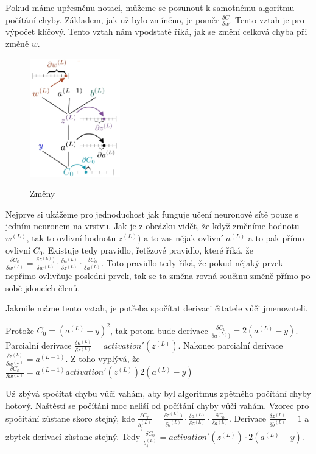 Pokud máme upřesněnu notaci, můžeme se posunout k samotnému algoritmu počítání chyby.
Základem, jak už bylo zmíněno, je poměr \(\frac{\delta C}{\delta w}\). Tento vztah je pro výpočet klíčový.
Tento vztah nám vpodstatě říká, jak se změní celková chyba při změně \(w\).

\begin{figure}[h]
    \centering
    \includegraphics[width=0.35\textwidth]{images/delta.png}
    \caption{Změny} \cite{delta}
\end{figure}

Nejprve si ukážeme pro jednoduchost jak funguje učení neuronové sítě pouze s jedním neuronem na vrstvu. Jak je z obrázku vidět, že když změníme hodnotu \(w^{(L)}\), tak to ovlivní hodnotu \(z^{(L)})\) a to zas nějak ovlivní \(a^{(L)}\) a to pak přímo ovlivní \(C_0\).
Existuje tedy pravidlo, řetězové pravidlo\cite{chain_rule}, které říká, že \(\frac{\delta C_0}{\delta w^{(L)}} = \frac{\delta z^{(L)})}{\delta w^{(L)}} \cdot \frac{\delta a^{(L)}}{\delta z^{(L)}} \cdot \frac{\delta C_0}{\delta a^{(L)}}\).
Toto pravidlo tedy říká, že pokud nějaký prvek nepřímo ovlivňuje poslední prvek, tak se ta změna rovná součinu změně přímo po sobě jdoucích členů.

Jakmile máme tento vztah, je potřeba spočítat derivaci čitatele vůči jmenovateli.

Protože \(C_0 = (a^{(L)} - y)^2\), tak potom bude derivace \(\frac{\delta C_0}{\delta a^{(L)})}= 2(a^{(L)} - y)\).
Parcialní derivace \(\frac{\delta a^{(L)}}{\delta z^{(L)}} = activation'(z^{(L)}) \).
Nakonec parcialní derivace \(\frac{\delta z^{(L)}}{\delta w^{(L)}} = a^{(L-1)}\).
Z toho vyplývá, že \(\frac{\delta C_0}{\delta w^{(L)}} = a^{(L-1)} activation'(z^{(L)}) 2(a^{(L)} - y)\)

Už zbývá spočítat chybu vůči vahám, aby byl algoritmus zpětného počítání chyby hotový.
Naštěstí se počítání moc neliší od počítání chyby vůči vahám.
Vzorec pro spočítání zůstane skoro stejný, kde \(\frac{\delta C_0}{b_j^{(L)}} = \frac{\delta z^{(L)})}{\delta b^{(L)}} \cdot \frac{\delta a^{(L)}}{\delta z^{(L)}} \cdot \frac{\delta C_0}{\delta a^{(L)}} \).
Derivace \(\frac{\delta z^{(L)}}{\delta b^{(L)}} = 1 \) a zbytek derivací zůstane stejný. Tedy \(\frac{\delta C_0}{b_j^{(L)}} =  activation'(z^{(L)}) \cdot 2(a^{(L)} - y)\).


